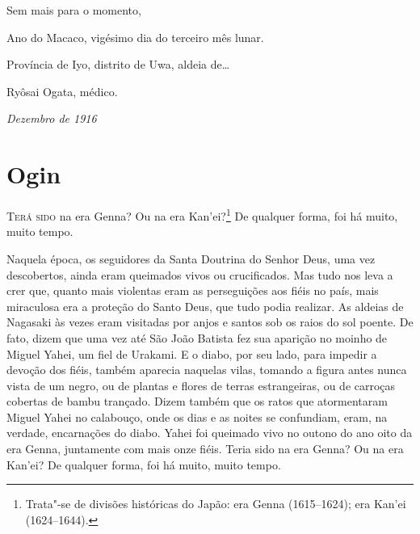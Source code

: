 Sem mais para o momento,

Ano do Macaco, vigésimo dia do terceiro mês lunar.

Província de Iyo, distrito de Uwa, aldeia de\ldots{}

Ryôsai Ogata, médico.

\begin{flushright}
\textit{Dezembro de 1916}\\  
\end{flushright}


\chapter{Ogin}

\noindent\textsc{Terá sido} na era Genna? Ou na era Kan'ei?\footnote{ Trata"-se de divisões
históricas do Japão: era Genna (1615--1624); era Kan'ei (1624--1644).}
De qualquer forma, foi há muito, muito tempo.

Naquela época, os seguidores da Santa Doutrina do Senhor Deus, uma vez
descobertos, ainda eram queimados vivos ou crucificados. Mas tudo nos
leva a crer que, quanto mais violentas eram as perseguições aos fiéis
no país, mais miraculosa era a proteção do Santo Deus, que tudo podia
realizar. As aldeias de Nagasaki às vezes eram visitadas por anjos e
santos sob os raios do sol poente. De fato, dizem que uma vez até São
João Batista fez sua aparição no moinho de Miguel Yahei, um fiel de
Urakami. E o diabo, por seu lado, para impedir a devoção dos fiéis,
também aparecia naquelas vilas, tomando a figura antes nunca vista de
um negro, ou de plantas e flores de terras estrangeiras, ou de carroças
cobertas de bambu trançado. Dizem também que os ratos que atormentaram
Miguel Yahei no calabouço, onde os dias e as noites se confundiam, eram, na verdade,
encarnações do diabo. Yahei foi queimado vivo no outono do ano oito da
era Genna, juntamente com mais onze fiéis. Teria sido na era Genna? Ou
na era Kan'ei? De qualquer forma, foi há muito, muito tempo.

